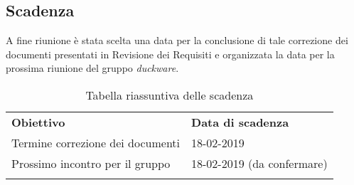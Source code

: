	\subsection{Scadenza}
	A fine riunione è stata scelta una data per la conclusione di tale correzione dei documenti presentati in Revisione dei Requisiti e organizzata la data per la prossima riunione del gruppo \textit{duckware}.
	
	\begin{center}
		\renewcommand{\arraystretch}{1.5}
		\begin{longtable}{  p{6cm} p{5cm}  }
			\rowcolor{tableHeadYellow}
			\textbf{Obiettivo} & \textbf{Data di scadenza}\\
			Termine correzione dei documenti & 18-02-2019 \\
			Prossimo incontro per il gruppo & 18-02-2019 (da confermare) \\
			\rowcolor{white}
			\caption{Tabella riassuntiva delle scadenza}
		\end{longtable}
	\end{center}
